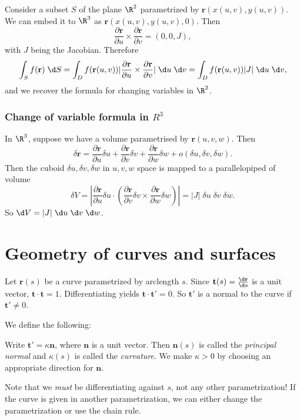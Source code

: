 \documentclass[a4paper]{article}
\begin{document}
Consider a subset $S$ of the plane $\R^2$ parametrized by $\mathbf{r}(x(u, v), y(u, v))$. We can embed it to $\R^3$ as $\mathbf{r}(x(u, v), y(u, v), 0)$. Then
\[
  \frac{\partial \mathbf{r}}{\partial u}\times \frac{\partial\mathbf{r}}{\partial v} = (0, 0, J),
\]
with $J$ being the Jacobian.
Therefore 
\[
  \int_S f(\mathbf{r})\;\d S = \int_D f(\mathbf{r}(u, v)) |\frac{\partial \mathbf{r}}{\partial u}\times \frac{\partial \mathbf{r}}{\partial v}| \;\d u\;\d v= \int_D f(\mathbf{r}(u, v))|J|\;\d u\;\d v,
\]
and we recover the formula for changing variables in $\R^2$.

\subsubsection*{Change of variable formula in \texorpdfstring{$R^3$}{R3}}
In $\R^3$, suppose we have a volume parametrised by $\mathbf{r}(u, v, w)$. Then
\[
  \delta \mathbf{r} = \frac{\partial \mathbf{r}}{\partial u}\delta u + \frac{\partial \mathbf{r}}{\partial v}\delta v + \frac{\partial \mathbf{r}}{\partial w}\delta w + o(\delta u, \delta v, \delta w).
\]
Then the cuboid $\delta u, \delta v, \delta w$ in $u, v, w$ space is mapped to a parallelopiped of volume
\[
  \delta V = \left|\frac{\partial \mathbf{r}}{\partial u}\delta u\cdot \left( \frac{\partial \mathbf{r}}{\partial v}\delta v \times \frac{\partial \mathbf{r}}{\partial w}\delta w\right)\right| = |J|\;\delta u\; \delta v\;\delta w.
\]
So $\d V = |J|\; \d u\; \d v\; \d w$.

\section{Geometry of curves and surfaces}
Let $\mathbf{r}(s)$ be a curve parametrized by arclength $s$. Since $\mathbf{t}(s) = \frac{\d \mathbf{r}}{\d s}$ is a unit vector, $\mathbf{t}\cdot \mathbf{t} = 1$. Differentiating yields $\mathbf{t}\cdot \mathbf{t}' = 0$. So $\mathbf{t}'$ is a normal to the curve if $\mathbf{t}' \not= 0$.

We define the following:
\begin{defi}
  Write $\mathbf{t}' = \kappa \mathbf{n}$, where $\mathbf{n}$ is a unit vector. Then $\mathbf{n}(s)$ is called the \emph{principal normal} and $\kappa(s)$ is called the \emph{curvature}. We make $\kappa > 0$ by choosing an appropriate direction for $\mathbf{n}$.
\end{defi}
Note that we \emph{must} be differentiating against $s$, not any other parametrization! If the curve is given in another parametrization, we can either change the parametrization or use the chain rule.
\end{document}
